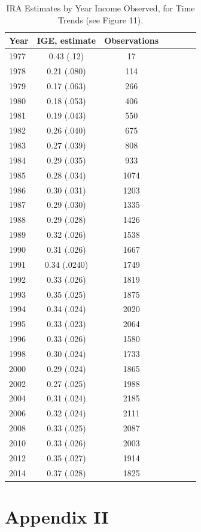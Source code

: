 \documentclass[notitlepage,12pt]{article}
\begin{document}
\begin{longtable}{l|cccccc}
\caption{IRA Estimates by Year Income Observed, for Time Trends (see Figure 11).} \\ \midrule
Year & IGE, estimate          & Observations  \\ \midrule 
1977 & 0.43 (.12) & 17   \\
1978 & 0.21  (.080) & 114 \\
1979 & 0.17  (.063) & 266  \\
1980 & 0.18  (.053) & 406      \\
1981 & 0.19  (.043) & 550     \\
1982 & 0.26  (.040)   & 675     \\
1983 & 0.27  (.039)  & 808     \\
1984 & 0.29  (.035) & 933    \\
1985 & 0.28  (.034) & 1074    \\
1986 & 0.30  (.031) & 1203     \\
1987 & 0.29  (.030) & 1335     \\
1988 & 0.29  (.028) & 1426     \\
1989  & 0.32  (.026)    &  1538  \\
1990 & 0.31  (.026) & 1667     \\
1991 & 0.34  (.0240) & 1749     \\
1992 & 0.33  (.026) & 1819     \\
1993 & 0.35  (.025) & 1875    \\
1994 & 0.34  (.024) & 2020   \\
1995 & 0.33 (.023) & 2064     \\
1996 & 0.33  (.026) & 1580    \\
1998 & 0.30  (.024) & 1733 \\
2000 & 0.29  (.024) & 1865 \\
2002 & 0.27  (.025) & 1988 \\
2004 & 0.31  (.024) & 2185 \\
2006 & 0.32  (.024) & 2111 \\
2008 & 0.33  (.025)  & 2087  \\
2010 & 0.33 (.026) & 2003 \\
2012 & 0.35 (.027) & 1914 \\
2014 & 0.37 (.028) & 1825  \\

\midrule \bottomrule
\end{longtable}

\section{Appendix II}
\end{document}
